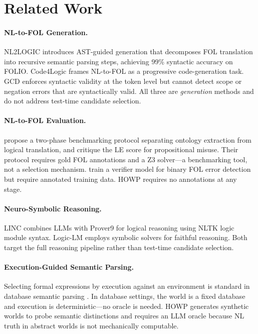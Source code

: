 \documentclass[11pt,letterpaper]{article}
\begin{document}
\section{Related Work}

\paragraph{NL-to-FOL Generation.}
NL2LOGIC \citep{Putra2025} introduces AST-guided generation that decomposes FOL translation into recursive semantic parsing steps, achieving 99\% syntactic accuracy on FOLIO. Code4Logic \citep{Liu2025} frames NL-to-FOL as a progressive code-generation task. GCD \citep{Geng2023} enforces syntactic validity at the token level but cannot detect scope or negation errors that are syntactically valid. All three are \emph{generation} methods and do not address test-time candidate selection.

\paragraph{NL-to-FOL Evaluation.}
\citet{Brunello2026} propose a two-phase benchmarking protocol separating ontology extraction from logical translation, and critique the LE score for propositional misuse. Their protocol requires gold FOL annotations and a Z3 solver---a benchmarking tool, not a selection mechanism. \citet{Thatikonda2024} train a verifier model for binary FOL error detection but require annotated training data. HOWP requires no annotations at any stage.

\paragraph{Neuro-Symbolic Reasoning.}
LINC \citep{Olausson2023} combines LLMs with Prover9 for logical reasoning using NLTK logic module syntax. Logic-LM \citep{Pan2023} employs symbolic solvers for faithful reasoning. Both target the full reasoning pipeline rather than test-time candidate selection.

\paragraph{Execution-Guided Semantic Parsing.}
Selecting formal expressions by execution against an environment is standard in database semantic parsing \citep{Pasupat2015, Min2019}. In database settings, the world is a fixed database and execution is deterministic---no oracle is needed. HOWP generates synthetic worlds to probe semantic distinctions and requires an LLM oracle because NL truth in abstract worlds is not mechanically computable.
\end{document}
